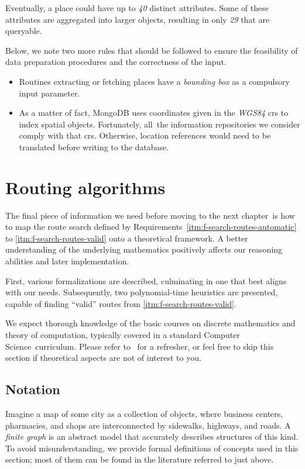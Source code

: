 Eventually, a place could have up to \emph{40} distinct attributes. Some of these attributes are aggregated into larger objects, resulting in only \emph{29} that are queryable.

Below, we note two more rules that should be followed to ensure the feasibility of data preparation procedures and the correctness of the input.

\begin{itemize}
\item Routines extracting or fetching places have a \emph{bounding box} as a compulsory input parameter.
\item As a matter of fact, MongoDB uses coordinates given in the \emph{WGS84} \ac{crs} to index spatial objects. Fortunately, all~the in\-for\-ma\-tion repositories we consider comply with that \acs{crs}. Otherwise, location references would need to be translated before writing to the database.
\end{itemize}

\section{Routing algorithms}\label{sec:routing-algorithms}

The final piece of information we need before moving to the next chapter~is how to map the route search defined by Requirements~\ref{itm:f-search-routes-automatic} to \ref{itm:f-search-routes-valid} onto a theoretical framework. A better understanding of the underlying mathematics positively affects our reasoning abilities and later implementation.

First, various formalizations are described, culminating in one that best aligns with our needs. Subsequently, two polynomial-time heuristics are presented, capable of finding ``valid'' routes from \ref{itm:f-search-routes-valid}.

We expect thorough knowledge of the basic courses on discrete mathematics and theory of computation, typically covered in a standard Computer Science~curriculum. Please refer to~\cite{matousek08,diestel17,sipser13} for a refresher, or feel free to skip this section if theoretical aspects are not of interest to you.

\subsection{Notation}\label{ssec:notation}

Imagine a map of some city as a collection of objects, where business centers, pharmacies, and shops are interconnected by sidewalks, highways, and roads. A \emph{finite graph} is an abstract model that accurately describes structures of this kind. To avoid misunderstanding, we provide formal definitions of concepts used in this section; most of them can be found in the literature referred to just above.

